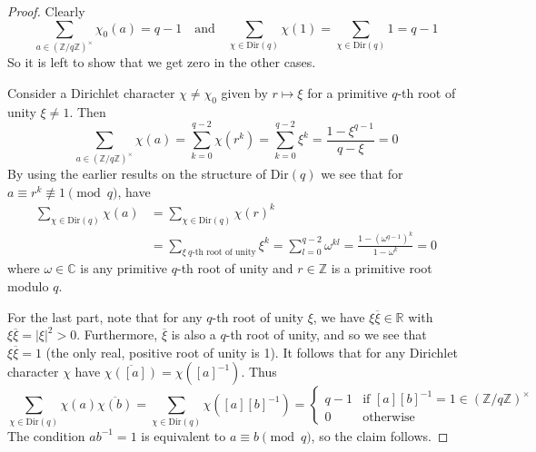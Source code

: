 \documentclass{scrartcl}
\newcommand{\R}{\mathbb{R}}
\newcommand{\Z}{\mathbb{Z}}
\newcommand{\C}{\mathbb{C}}
\newcommand{\units}{\times}
\theoremstyle{definition}
\begin{document}
\begin{proof}
    Clearly
    \begin{equation*}
        \sum_{a \in (\Z/q\Z)^\units} \chi_0(a) = q - 1 \quad \text{and} \quad \sum_{\chi \in \mathrm{Dir}(q)} \chi(1) = \sum_{\chi \in \mathrm{Dir}(q)} 1 = q - 1
    \end{equation*}
    So it is left to show that we get zero in the other cases.
    
    Consider a Dirichlet character $\chi \neq \chi_0$ given by $r \mapsto \xi$ for a primitive $q$-th root of unity $\xi \neq 1$.
    Then
    \begin{equation*}
        \sum_{a \in (\Z/q\Z)^\units} \chi(a) = \sum_{k = 0}^{q - 2} \chi(r^k) = \sum_{k = 0}^{q - 2} \xi^k = \frac {1 - \xi^{q - 1}} {q - \xi} = 0 
    \end{equation*}
    By using the earlier results on the structure of $\mathrm{Dir}(q)$ we see that for $a \equiv r^k \not\equiv 1 \pmod q$, have
    \begin{align*}
        \sum_{\chi \in \mathrm{Dir}(q)} \chi(a) &= \sum_{\chi \in \mathrm{Dir}(q)} \chi(r)^k \\
        &= \sum_{\xi \ \text{$q$-th root of unity}} \xi^k = \sum_{l = 0}^{q - 2} \omega^{kl} = \frac {1 - (\omega^{q - 1})^k} {1 - \omega^k} = 0 
    \end{align*}
    where $\omega \in \C$ is any primitive $q$-th root of unity and $r \in \Z$ is a primitive root modulo $q$.
    
    For the last part, note that for any $q$-th root of unity $\xi$, we have $\xi\overline{\xi} \in \R$ with $\xi\overline{\xi} = |\xi|^2 > 0$.
    Furthermore, $\overline{\xi}$ is also a $q$-th root of unity, and so we see that $\xi\overline{\xi} = 1$ (the only real, positive root of unity is 1).
    It follows that for any Dirichlet character $\chi$ have $\overline{\chi([a])} = \chi([a]^{-1})$.
    Thus
    \begin{equation*}
        \sum_{\chi \in \mathrm{Dir}(q)} \chi(a)\overline{\chi(b)} = \sum_{\chi \in \mathrm{Dir}(q)} \chi([a][b]^{-1}) = \begin{cases}
            q - 1 & \text{if $[a][b]^{-1} = 1 \in (\Z/q\Z)^\units$} \\
            0 & \text{otherwise}
        \end{cases}
    \end{equation*}
    The condition $ab^{-1} = 1$ is equivalent to $a \equiv b \pmod q$, so the claim follows.
\end{proof}
\end{document}
